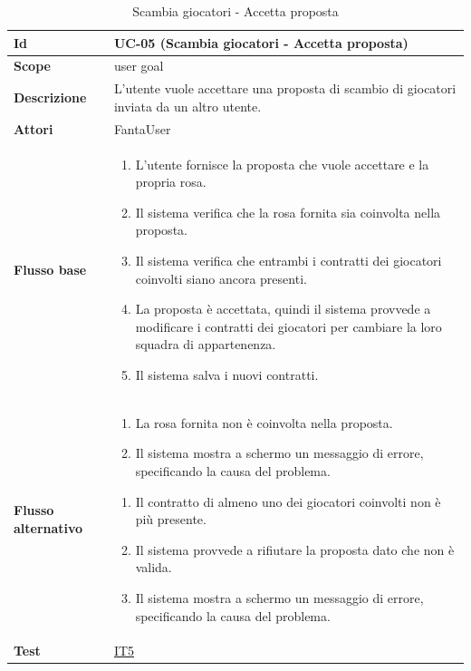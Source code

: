 \begin{table}[H]
\caption{Scambia giocatori - Accetta proposta}
\label{UC-05}

\begin{tabularx}{\textwidth}{|l|X|}
\hline
\textbf{Id} & UC-05 (Scambia giocatori - Accetta proposta) \\
\hline
\textbf{Scope} & user goal \\
\hline
\textbf{Descrizione} & L'utente vuole accettare una proposta di scambio di giocatori inviata da un altro utente. \\
\hline
\textbf{Attori} & FantaUser \\
\hline
\textbf{Flusso base} &
\begin{enumerate}[leftmargin=*]
    \item L'utente fornisce la proposta che vuole accettare e la propria rosa.
    \item Il sistema verifica che la rosa fornita sia coinvolta nella proposta.
    \item Il sistema verifica che entrambi i contratti dei giocatori coinvolti siano ancora presenti.
    \item La proposta è accettata, quindi il sistema provvede a modificare i contratti dei giocatori
            per cambiare la loro squadra di appartenenza.
    \item Il sistema salva i nuovi contratti. 
\end{enumerate} \\
\hline
\textbf{Flusso alternativo} &
\begin{enumerate}[leftmargin=*,label=2.\arabic*]
    \item La rosa fornita non è coinvolta nella proposta.
    \item Il sistema mostra a schermo un messaggio di errore, specificando la causa del problema.
\end{enumerate}
\begin{enumerate}[leftmargin=*,label=3.\arabic*]
    \item Il contratto di almeno uno dei giocatori coinvolti non è più presente.
    \item Il sistema provvede a rifiutare la proposta dato che non è valida.
    \item Il sistema mostra a schermo un messaggio di errore, specificando la causa del problema.
\end{enumerate} \\
\hline
\textbf{Test} & \hyperref[IT5]{IT5} \\
\hline
\end{tabularx}

\end{table}


